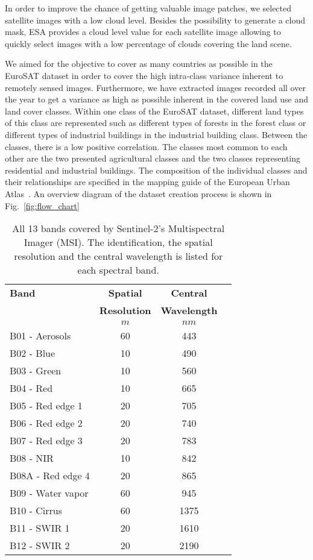 \documentclass[journal]{IEEEtran}
\begin{document}
In order to improve the chance of getting valuable image patches, we selected satellite images with a low cloud level. Besides the possibility to generate a cloud mask, ESA provides a cloud level value for each satellite image allowing to quickly select images with a low percentage of clouds covering the land scene. 




We aimed for the objective to cover as many countries as possible in the EuroSAT dataset in order to cover the high intra-class variance inherent to remotely sensed images. Furthermore, we have extracted images recorded all over the year to get a variance as high as possible inherent in the covered land use and land cover classes. Within one class of the EuroSAT dataset, different land types of this class are represented such as different types of forests in the forest class or different types of industrial buildings in the industrial building class. Between the classes, there is a low positive correlation. The classes most common to each other are the two presented agricultural classes and the two classes representing residential and industrial buildings. The composition of the individual classes and their relationships are specified in the mapping guide of the European Urban Atlas~\cite{mapEUA}. An overview diagram of the dataset creation process is shown in Fig.~\ref{fig:flow_chart}

\begin{table}[t!]
\vspace{+0.25cm}
\caption{All 13 bands covered by Sentinel-2's Multispectral Imager (MSI). The identification, the spatial resolution and the central wavelength is listed for each spectral band.}
\centering
\begin{tabular}{lccc}\toprule
\textbf{Band}	&\textbf{Spatial} &\textbf{Central}	\\
& \textbf{Resolution} & \textbf{Wavelength} \\
& \(m\)	& \(nm\)  \\\midrule

B01	- Aerosols	& 60	& 443	 \\
B02 - Blue 	& 10	& 490		\\
B03	- Green	& 10	& 560		\\
B04	- Red	& 10	& 665		\\
B05 - Red edge 1		& 20	& 705	 \\
B06 - Red edge 2	& 20	& 740	\\
B07	- Red edge 3	& 20	& 783	\\
B08 - NIR		& 10	& 842	\\
B08A - Red edge 4	& 20	& 865  \\
B09	- Water vapor	& 60	& 945 \\
B10	- Cirrus	& 60	& 1375 \\
B11	- SWIR 1	& 20	& 1610 \\
B12	- SWIR 2	& 20	& 2190 \\\bottomrule
\end{tabular}
\label{table:1}
\end{table}
\end{document}
